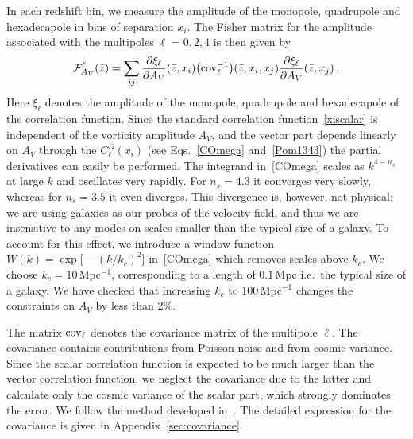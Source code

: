 \documentclass[a4paper,twocolumn,aps,prd,nolongbibliography,superscriptaddress,showpacs,showkeys,amsmath,amssymb,floatfix,nofootinbib]{revtex4-1}
\renewcommand{\[}{\begin{equation}}
\renewcommand{\]}{\end{equation}}
\begin{document}
In each redshift bin, we measure the amplitude of the monopole, quadrupole and hexadecapole in bins of separation $x_i$.
The Fisher matrix for the amplitude associated with the multipoles $\ell=0,2,4$ is then given by
\[
\mathcal{F}^\ell_{A_V}(\bar z)=\sum_{ij}\frac{\partial \xi_\ell}{\partial A_V}(\bar z, x_i)\big({\rm cov_\ell^{-1}} \big)(\bar z, x_i,x_j)\frac{\partial \xi_\ell}{\partial A_V}(\bar z, x_j)\, .\label{FAV}
\]       
Here $\xi_\ell$ denotes the amplitude of the monopole, quadrupole and hexadecapole of the correlation function. Since the standard correlation function~\eqref{xiscalar} is independent of the vorticity amplitude $A_V$, and the vector part depends linearly on $A_V$ through the $C_{\ell}^{\Omega}(x_i)$ (see Eqs.~\eqref{COmega} and~\eqref{Pom1343}) the partial derivatives can easily be performed. The integrand in~\eqref{COmega} scales as $k^{4-n_s}$ at large $k$ and oscillates very rapidly. For $n_s=4.3$ it converges very slowly, whereas for $n_s=3.5$ it even diverges. This divergence is, however, not physical: we are using galaxies as our probes of the velocity field, and thus we are insensitive to any modes on scales smaller than the typical size of a galaxy. To account for this effect, we introduce a window function $W(k)=\exp\big[-\left(k/k_c \right)^2 \big]$ in~\eqref{COmega} which removes scales above $k_c$. We choose $k_c=10$\,Mpc$^{-1}$, corresponding to a length of $0.1$\,Mpc i.e.\ the typical size of a galaxy. We have checked that increasing $k_c$ to $100$\,Mpc$^{-1}$ changes the constraints on $A_V$ by less than 2\%.

The matrix ${\rm cov}_\ell$ denotes the covariance matrix of the multipole $\ell$. The covariance contains contributions from Poisson noise and from cosmic variance. Since the scalar correlation function is expected to be much larger than the vector correlation function, we neglect the covariance due to the latter and calculate only the cosmic variance of the scalar part, which strongly dominates the error. We follow the method developed in~\cite{Bonvin:2015kuc,Hall:2016bmm}. The detailed expression for the covariance is given in Appendix~\ref{sec:covariance}.
\end{document}
